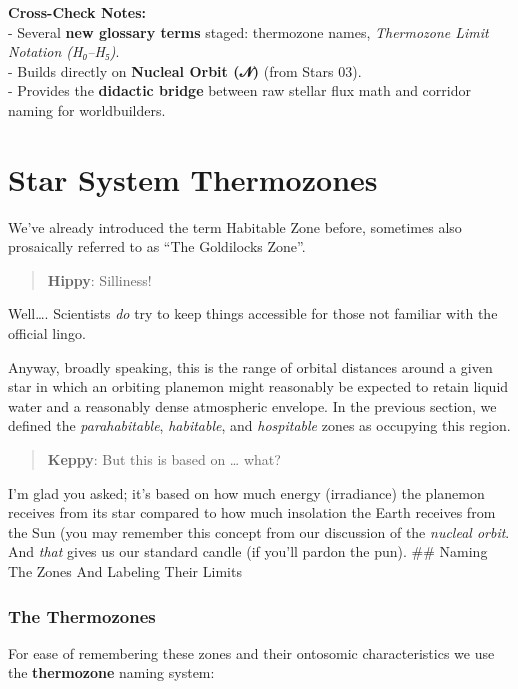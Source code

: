 \documentclass[
  letterpaper,
]{book}
\begin{document}
\textbf{Cross-Check Notes:}\\
- Several \textbf{new glossary terms} staged: thermozone names,
\emph{Thermozone Limit Notation (H₀--H₅)}.\\
- Builds directly on \textbf{Nucleal Orbit (𝒩)} (from Stars 03).\\
- Provides the \textbf{didactic bridge} between raw stellar flux math
and corridor naming for worldbuilders.

\chapter{Star System Thermozones}\label{star-system-thermozones}

We've already introduced the term Habitable Zone before, sometimes also
prosaically referred to as ``The Goldilocks Zone''.

\begin{quote}
\textbf{Hippy}: Silliness!
\end{quote}

Well\ldots. Scientists \emph{do} try to keep things accessible for those
not familiar with the official lingo.

Anyway, broadly speaking, this is the range of orbital distances around
a given star in which an orbiting planemon might reasonably be expected
to retain liquid water and a reasonably dense atmospheric envelope. In
the previous section, we defined the \emph{parahabitable},
\emph{habitable}, and \emph{hospitable} zones as occupying this region.

\begin{quote}
\textbf{Keppy}: But this is based on \ldots{} what?
\end{quote}

I'm glad you asked; it's based on how much energy (irradiance) the
planemon receives from its star compared to how much insolation the
Earth receives from the Sun (you may remember this concept from our
discussion of the \emph{nucleal orbit}. And \emph{that} gives us our
standard candle (if you'll pardon the pun). \#\# Naming The Zones And
Labeling Their Limits

\subsection{The Thermozones}\label{the-thermozones}

For ease of remembering these zones and their ontosomic characteristics
we use the \textbf{thermozone} naming system:
\end{document}
